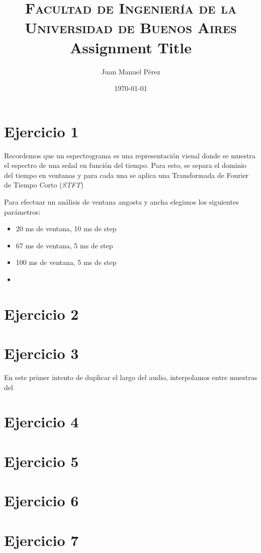 \documentclass[paper=a4, fontsize=11pt]{scrartcl} %
\title{
\normalfont \normalsize
\textsc{Facultad de Ingeniería de la Universidad de Buenos Aires} \\ [20pt] %
\huge Assignment Title \\ %
}
\author{Juan Manuel Pérez} %
\date{\normalsize\today} %
\numberwithin{equation}{section} %
\numberwithin{figure}{section} %
\numberwithin{table}{section} %
\newcommand{\stft}{\emph{STFT}}
\begin{document}
\maketitle %


\section{Ejercicio 1}

Recordemos que un espectrograma es una representación visual donde se muestra el espectro de una señal en función del tiempo. Para esto, se separa el dominio del tiempo en ventanas y para cada una se aplica una Transformada de Fourier de Tiempo Corto (\stft)

Para efectuar un análisis de ventana angosta y ancha elegimos los siguientes parámetros:

\begin{itemize}
    \item 20 ms de ventana, 10 ms de step
    \item 67 ms de ventana, 5 ms de step
    \item 100 ms de ventana, 5 ms de step
    \item
\end{itemize}


\section{Ejercicio 2}

\section{Ejercicio 3}

En este primer intento de duplicar el largo del audio, interpolamos entre muestras del

\section{Ejercicio 4}

\section{Ejercicio 5}

\section{Ejercicio 6}

\section{Ejercicio 7}
\end{document}
